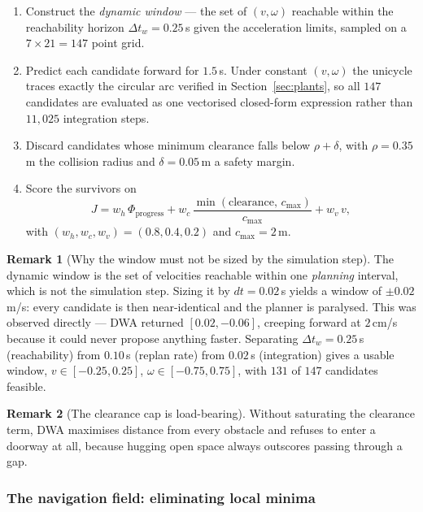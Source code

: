 \documentclass[11pt,a4paper]{article}
\theoremstyle{plain}
\theoremstyle{definition}
\newtheorem{remark}{Remark}
\begin{document}
\begin{enumerate}
\item Construct the \emph{dynamic window} --- the set of
      $(v, \omega)$ reachable within the reachability horizon
      $\Delta t_w = 0.25$\,s given the acceleration limits, sampled on a
      $7 \times 21 = 147$ point grid.
\item Predict each candidate forward for $1.5$\,s. Under constant
      $(v,\omega)$ the unicycle traces exactly the circular arc verified
      in Section~\ref{sec:plants}, so all $147$ candidates are evaluated
      as one vectorised closed-form expression rather than $11{,}025$
      integration steps.
\item Discard candidates whose minimum clearance falls below
      $\rho + \delta$, with $\rho = 0.35$\,m the collision radius and
      $\delta = 0.05$\,m a safety margin.
\item Score the survivors on
      \[
        J = w_h\,\Phi_{\text{progress}}
          + w_c\,\frac{\min(\text{clearance},\, c_{\max})}{c_{\max}}
          + w_v\,v ,
      \]
      with $(w_h, w_c, w_v) = (0.8, 0.4, 0.2)$ and $c_{\max} = 2$\,m.
\end{enumerate}

\begin{remark}[Why the window must not be sized by the simulation step]
The dynamic window is the set of velocities reachable within one
\emph{planning} interval, which is not the simulation step. Sizing it by
$dt = 0.02$\,s yields a window of $\pm 0.02$\,m/s: every candidate is
then near-identical and the planner is paralysed. This was observed
directly --- DWA returned $[0.02, -0.06]$, creeping forward at $2$\,cm/s
because it could never propose anything faster. Separating
$\Delta t_w = 0.25$\,s (reachability) from $0.10$\,s (replan rate) from
$0.02$\,s (integration) gives a usable window,
$v \in [-0.25, 0.25]$, $\omega \in [-0.75, 0.75]$, with $131$ of $147$
candidates feasible.
\end{remark}

\begin{remark}[The clearance cap is load-bearing]
Without saturating the clearance term, DWA maximises distance from every
obstacle and refuses to enter a doorway at all, because hugging open
space always outscores passing through a gap.
\end{remark}

\subsubsection*{The navigation field: eliminating local minima}
\end{document}
